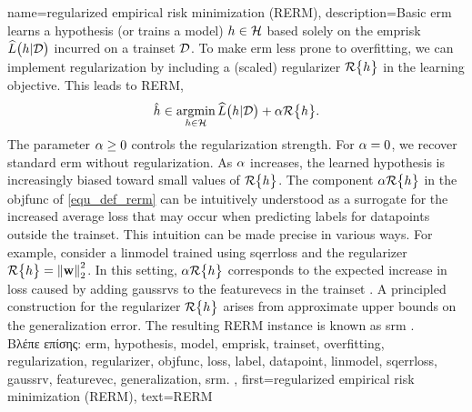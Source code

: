 {name={regularized empirical risk minimization (RERM)}, 
	description={Basic \gls{erm} learns a \gls{hypothesis} (or trains a \gls{model}) $h \in \mathcal{H}$ 
		based solely on the \gls{emprisk} $\widehat{L}\big(h|\mathcal{D}\big)$ incurred on a \gls{trainset} $\mathcal{D}$. 
		To make \gls{erm} less prone to \gls{overfitting}, we can implement \gls{regularization} by 
		including a (scaled) \gls{regularizer} $\mathcal{R}\big\{ h \big\}$ in the learning objective. 
		This leads to RERM, 
		\begin{equation}
			\label{equ_def_rerm}
			\hat{h} \in \operatorname*{argmin}_{h \in \mathcal{H}} \widehat{L}\big(h|\mathcal{D}\big) + \alpha \mathcal{R}\big\{ h \big\}.
		\end{equation}
		The parameter $\alpha \geq 0$ controls the \gls{regularization} strength. 
		For $\alpha = 0$, we recover standard \gls{erm} without \gls{regularization}. As $\alpha$ increases, the 
		learned \gls{hypothesis} is increasingly biased toward small values of $\mathcal{R}\big\{ h \big\}$. 
		The component $\alpha \mathcal{R}\big\{ h \big\}$ in the \gls{objfunc} of \eqref{equ_def_rerm} 
		can be intuitively understood as a surrogate for the increased average \gls{loss} that may 
		occur when predicting \gls{label}s for \gls{datapoint}s outside the \gls{trainset}. This intuition  
		can be made precise in various ways. For example, consider a \gls{linmodel} trained using \gls{sqerrloss} 
		and the \gls{regularizer} $\mathcal{R}\big\{ h \big\} = \left\Vert {{\bf w}} \right\Vert_{2}^{2}$. 
		In this setting, $\alpha \mathcal{R}\big\{ h \big\}$ corresponds to the expected increase in \gls{loss} 
		caused by adding \gls{gaussrv}s to the \gls{featurevec}s in the \gls{trainset} 
		\cite[Ch. 3]{MLBasics}.
		A principled construction for the \gls{regularizer} $\mathcal{R}\big\{ h \big\}$ 
		arises from approximate upper bounds on the \gls{generalization} error. The resulting 
		RERM instance is known as \gls{srm} \cite[Sec. 7.2]{ShalevShwartz2009}.\\
		\foreignlanguage{greek}{Βλέπε επίσης:} \gls{erm}, \gls{hypothesis}, \gls{model}, \gls{emprisk}, \gls{trainset}, \gls{overfitting}, \gls{regularization}, \gls{regularizer}, \gls{objfunc}, \gls{loss}, \gls{label}, \gls{datapoint}, \gls{linmodel}, \gls{sqerrloss}, \gls{gaussrv}, \gls{featurevec}, \gls{generalization}, \gls{srm}.
	}, 
	first={regularized empirical risk minimization (RERM)},
	text={RERM} 
}

